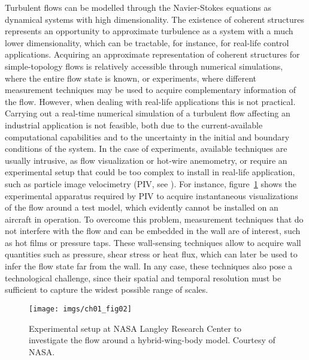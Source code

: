 Turbulent flows can be modelled through the Navier-Stokes equations as dynamical systems with high dimensionality.
The existence of coherent structures represents an opportunity to approximate turbulence as a system with a much lower dimensionality, which can be tractable, for instance, for real-life control applications.
Acquiring an approximate representation of coherent structures for simple-topology flows is relatively accessible through numerical simulations, where the entire flow state is known, or experiments, where different measurement techniques may be used to acquire complementary information of the flow.
However, when dealing with real-life applications this is not practical.
Carrying out a real-time numerical simulation of a turbulent flow affecting an industrial application is not feasible, both due to the current-available computational capabilities and to the uncertainty in the initial and boundary conditions of the system.
In the case of experiments, available techniques are usually intrusive, as flow visualization or hot-wire anemometry, or require an experimental setup that could be too complex to install in real-life application, such as particle image velocimetry (PIV, see \citet{adrian1991particle}).
For instance, figure~\ref{ch01:fig02} shows the experimental apparatus required by PIV to acquire instantaneous visualizations of the flow around a test model, which evidently cannot be installed on an aircraft in operation.
To overcome this problem, measurement techniques that do not interfere with the flow and can be embedded in the wall are of interest, such as hot films or pressure taps.
These wall-sensing techniques allow to acquire wall quantities such as pressure, shear stress or heat flux, which can later be used to infer the flow state far from the wall.
In any case, these techniques also pose a technological challenge, since their spatial and temporal resolution must be sufficient to capture the widest possible range of scales.
\begin{figure}
  \centering
  \texttt{[image: imgs/ch01\_fig02]}
  \caption{\label{ch01:fig02}Experimental setup at NASA Langley Research Center to investigate the flow around a hybrid-wing-body model. Courtesy of NASA.}
\end{figure}

